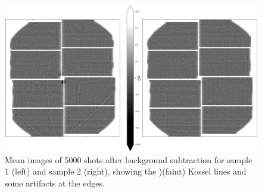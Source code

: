 \begin{figure}[h!]
	\centering
	\includegraphics[width=0.8\linewidth]{images/kossel_gaas.png}
	\caption[Mean image of fluorescence of GaAs after background subtraction with visible Kossel lines ]{Mean images of 5000 shots after background subtraction for sample 1 (left) and sample 2 (right), showing the )(faint) Kossel lines and some artifacts at the edges.}
	\label{fig:kosselgaasmean}
\end{figure}



